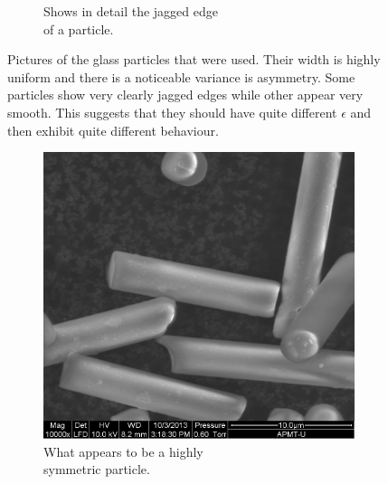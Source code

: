 \begin{figure}[H]
\begin{subfigure}[3b]{0.40\textwidth}
\caption{Shows in detail the jagged edge \\ of a particle.}
\end{subfigure}
\caption{Pictures of the glass particles that were used. Their width is highly uniform and there is a noticeable variance is asymmetry. Some particles show very clearly jagged edges while other appear very smooth. This suggests that they should have quite different $\epsilon$ and then exhibit quite different behaviour.}
\label{fig:particlepictures}
\end{figure}
 
\begin{figure}[H]
\centering
\begin{subfigure}[3a]{0.40\textwidth}
\includegraphics[width=\textwidth]{figures/method/symmetric.png}
\caption{What appears to be a highly \\ symmetric particle.}\label{fig:symmetricparticle}
\end{subfigure}\hspace{1em}%
\begin{subfigure}[3b]{0.40\textwidth}

\end{subfigure}
\end{figure}
